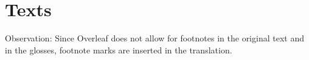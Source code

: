 \chapter{Texts}

Observation: Since Overleaf does not allow for footnotes in the original text and in the glosses, footnote marks are inserted in the translation.


